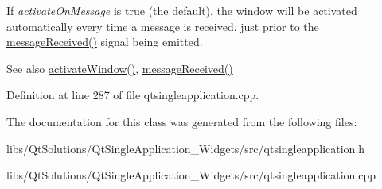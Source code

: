 If {\itshape activate\+On\+Message} is true (the default), the window will be activated automatically every time a message is received, just prior to the \hyperlink{class_qt_single_application_a69340cef3d26d026e11424930e5a5866}{message\+Received()} signal being emitted.

\begin{DoxySeeAlso}{See also}
\hyperlink{class_qt_single_application_a0881b32c76132b499f3180064006abc1}{activate\+Window()}, \hyperlink{class_qt_single_application_a69340cef3d26d026e11424930e5a5866}{message\+Received()} 
\end{DoxySeeAlso}


Definition at line 287 of file qtsingleapplication.\+cpp.



The documentation for this class was generated from the following files\+:\begin{DoxyCompactItemize}
\item 
libs/\+Qt\+Solutions/\+Qt\+Single\+Application\+\_\+\+Widgets/src/qtsingleapplication.\+h\item 
libs/\+Qt\+Solutions/\+Qt\+Single\+Application\+\_\+\+Widgets/src/qtsingleapplication.\+cpp\end{DoxyCompactItemize}
